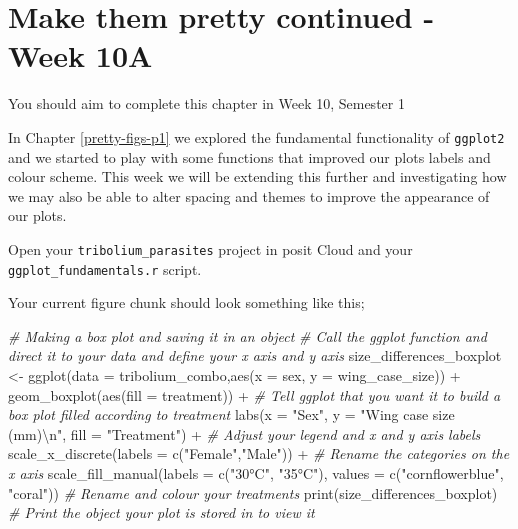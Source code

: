 \documentclass[
]{book}
\newenvironment{Shaded}{\begin{snugshade}}{\end{snugshade}}
\newcommand{\AttributeTok}[1]{\textcolor[rgb]{0.77,0.63,0.00}{#1}}
\newcommand{\CommentTok}[1]{\textcolor[rgb]{0.56,0.35,0.01}{\textit{#1}}}
\newcommand{\FunctionTok}[1]{\textcolor[rgb]{0.00,0.00,0.00}{#1}}
\newcommand{\NormalTok}[1]{#1}
\newcommand{\OtherTok}[1]{\textcolor[rgb]{0.56,0.35,0.01}{#1}}
\newcommand{\SpecialCharTok}[1]{\textcolor[rgb]{0.00,0.00,0.00}{#1}}
\newcommand{\StringTok}[1]{\textcolor[rgb]{0.31,0.60,0.02}{#1}}
\begin{document}
\hypertarget{pretty-figs-p2}{%
\chapter{Make them pretty continued - Week 10A}\label{pretty-figs-p2}}

You should aim to complete this chapter in Week 10, Semester 1

In Chapter \ref{pretty-figs-p1} we explored the fundamental functionality of \texttt{ggplot2} and we started to play with some functions that improved our plots labels and colour scheme. This week we will be extending this further and investigating how we may also be able to alter spacing and themes to improve the appearance of our plots.

Open your \texttt{tribolium\_parasites} project in posit Cloud and your \texttt{ggplot\_fundamentals.r} script.

Your current figure chunk should look something like this;

\begin{Shaded}
\begin{Highlighting}[]
\CommentTok{\# Making a box plot and saving it in an object}
\CommentTok{\# Call the ggplot function and direct it to your data and define your x axis and y axis}
\NormalTok{size\_differences\_boxplot }\OtherTok{\textless{}{-}} \FunctionTok{ggplot}\NormalTok{(}\AttributeTok{data =}\NormalTok{ tribolium\_combo,}\FunctionTok{aes}\NormalTok{(}\AttributeTok{x =}\NormalTok{ sex, }\AttributeTok{y =}\NormalTok{ wing\_case\_size)) }\SpecialCharTok{+} 
  \FunctionTok{geom\_boxplot}\NormalTok{(}\FunctionTok{aes}\NormalTok{(}\AttributeTok{fill =}\NormalTok{ treatment)) }\SpecialCharTok{+} \CommentTok{\# Tell ggplot that you want it to build a box plot filled according to treatment}
  \FunctionTok{labs}\NormalTok{(}\AttributeTok{x =} \StringTok{"Sex"}\NormalTok{, }\AttributeTok{y =} \StringTok{"Wing case size (mm)}\SpecialCharTok{\textbackslash{}n}\StringTok{"}\NormalTok{, }\AttributeTok{fill =} \StringTok{"Treatment"}\NormalTok{) }\SpecialCharTok{+} \CommentTok{\# Adjust your legend and x and y axis labels }
  \FunctionTok{scale\_x\_discrete}\NormalTok{(}\AttributeTok{labels =} \FunctionTok{c}\NormalTok{(}\StringTok{"Female"}\NormalTok{,}\StringTok{"Male"}\NormalTok{)) }\SpecialCharTok{+} \CommentTok{\# Rename the categories on the x axis }
  \FunctionTok{scale\_fill\_manual}\NormalTok{(}\AttributeTok{labels =} \FunctionTok{c}\NormalTok{(}\StringTok{"30°C"}\NormalTok{, }\StringTok{"35°C"}\NormalTok{), }\AttributeTok{values =} \FunctionTok{c}\NormalTok{(}\StringTok{"cornflowerblue"}\NormalTok{, }\StringTok{"coral"}\NormalTok{)) }\CommentTok{\# Rename and colour your treatments}
\FunctionTok{print}\NormalTok{(size\_differences\_boxplot) }\CommentTok{\# Print the object your plot is stored in to view it}
\end{Highlighting}
\end{Shaded}
\end{document}
